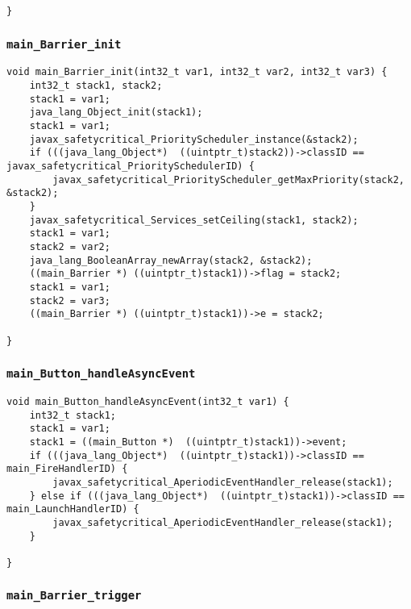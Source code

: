 \begin{landscape}
\begin{multicols}{2}
\begin{lstlisting}[firstnumber=1666]
}
\end{lstlisting}

\subsubsection{\texttt{main\_Barrier\_init}}

\begin{lstlisting}[firstnumber=1728]
void main_Barrier_init(int32_t var1, int32_t var2, int32_t var3) {
	int32_t stack1, stack2;
	stack1 = var1;
	java_lang_Object_init(stack1);
	stack1 = var1;
	javax_safetycritical_PriorityScheduler_instance(&stack2);
	if (((java_lang_Object*)  ((uintptr_t)stack2))->classID == javax_safetycritical_PrioritySchedulerID) {
		javax_safetycritical_PriorityScheduler_getMaxPriority(stack2, &stack2);
	}
	javax_safetycritical_Services_setCeiling(stack1, stack2);
	stack1 = var1;
	stack2 = var2;
	java_lang_BooleanArray_newArray(stack2, &stack2);
	((main_Barrier *) ((uintptr_t)stack1))->flag = stack2;
	stack1 = var1;
	stack2 = var3;
	((main_Barrier *) ((uintptr_t)stack1))->e = stack2;

}
\end{lstlisting}

\subsubsection{\texttt{main\_Button\_handleAsyncEvent}}

\begin{lstlisting}[firstnumber=1765]
void main_Button_handleAsyncEvent(int32_t var1) {
	int32_t stack1;
	stack1 = var1;
	stack1 = ((main_Button *)  ((uintptr_t)stack1))->event;
	if (((java_lang_Object*)  ((uintptr_t)stack1))->classID == main_FireHandlerID) {
		javax_safetycritical_AperiodicEventHandler_release(stack1);
	} else if (((java_lang_Object*)  ((uintptr_t)stack1))->classID == main_LaunchHandlerID) {
		javax_safetycritical_AperiodicEventHandler_release(stack1);
	}

}
\end{lstlisting}

\subsubsection{\texttt{main\_Barrier\_trigger}}


\end{multicols}
\end{landscape}

